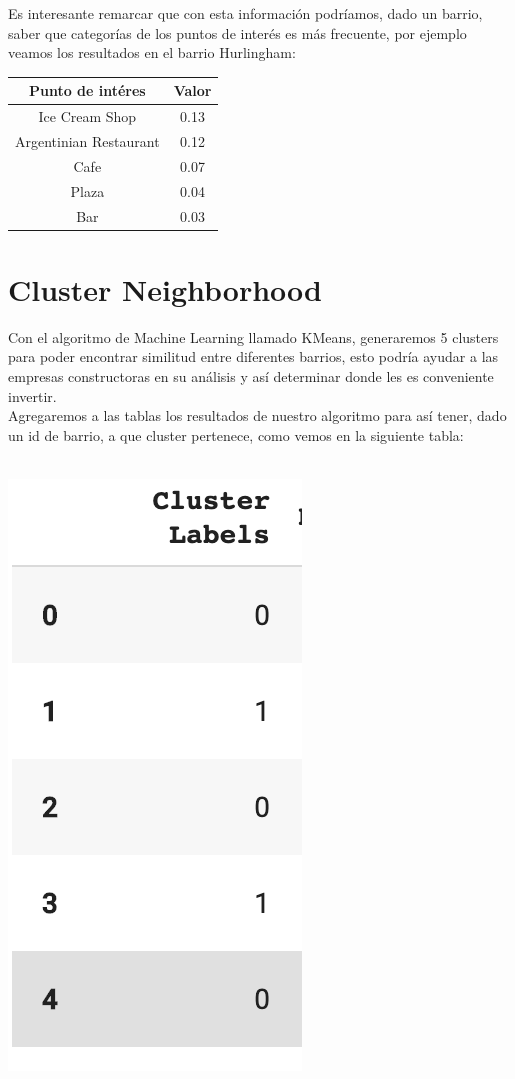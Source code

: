 \documentclass[12pt,a4paper]{tesis}
\begin{document}
Es interesante remarcar que con esta información podríamos, dado un barrio, saber que categorías de los puntos de interés es más frecuente, por ejemplo veamos los resultados en el barrio Hurlingham:

\begin{center}
 \begin{tabular}{||c c ||} 
 \hline
 Punto de intéres & Valor \\ [0.5ex] 
 \hline\hline
 Ice Cream Shop & 0.13 \\ 
 \hline
 Argentinian Restaurant & 0.12 \\
 \hline
 Cafe & 0.07  \\
 \hline
 Plaza & 0.04  \\
 \hline
 Bar & 0.03  \\ [1ex] 
 \hline
\end{tabular}
\end{center}


\chapter{Cluster Neighborhood}
Con el algoritmo de Machine Learning llamado KMeans, generaremos 5 clusters para poder encontrar similitud entre diferentes barrios, esto podría ayudar a las empresas constructoras en su análisis y así determinar donde les es conveniente invertir.\\
Agregaremos a las tablas los resultados de nuestro algoritmo para así tener, dado un id de barrio, a que cluster pertenece, como vemos en la siguiente tabla:\\ \\
\centerline{
	\includegraphics[scale=0.5]{tabla3}
}
\end{document}
